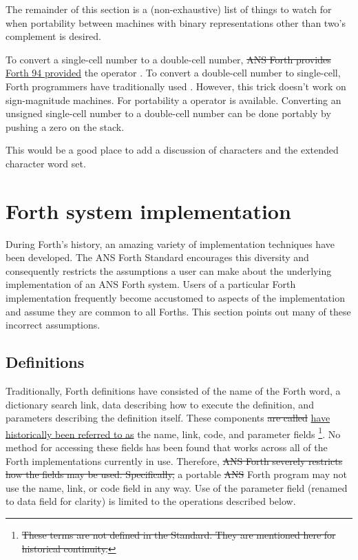 The remainder of this section is a (non-exhaustive) list of things to
watch for when portability between machines with binary representations
other than two's complement is desired.

To convert a single-cell number to a double-cell number,
\sout{ANS Forth provides} \uline{Forth 94 provided} the operator
. To convert a double-cell number to
single-cell, Forth programmers have traditionally used .
However, this trick doesn't work on sign-magnitude machines. For
portability a  operator is available. Converting an
unsigned single-cell number to a double-cell number can be done portably
by pushing a zero on the stack.


\begin{editor}
This would be a good place to add a discussion
of characters and the extended character word set.
\end{editor}

\section{Forth system implementation} %

During Forth's history, an amazing variety of implementation techniques
have been developed. The ANS Forth Standard encourages this diversity
and consequently restricts the assumptions a user can make about the
underlying implementation of an ANS Forth system. Users of a particular
Forth implementation frequently become accustomed to aspects of the
implementation and assume they are common to all Forths. This section
points out many of these incorrect assumptions.

\subsection{Definitions} %

Traditionally, Forth definitions have consisted of the name of the
Forth word, a dictionary search link, data describing how to execute
the definition, and parameters describing the definition itself. These
components \sout{are called} \uline{have historically been referred to as} the name, link, code, and parameter fields%
\footnote{\sout{These terms are not defined in the Standard.
They are mentioned here for historical continuity.}}.
No method for accessing these fields has been found that works
across all of the Forth implementations currently in use. Therefore,
\sout{ANS Forth severely restricts how the fields may be used. Specifically,}
a portable \sout{ANS} Forth program may not use the name, link, or code field
in any way. Use of the parameter field (renamed to data field for
clarity) is limited to the operations described below.

